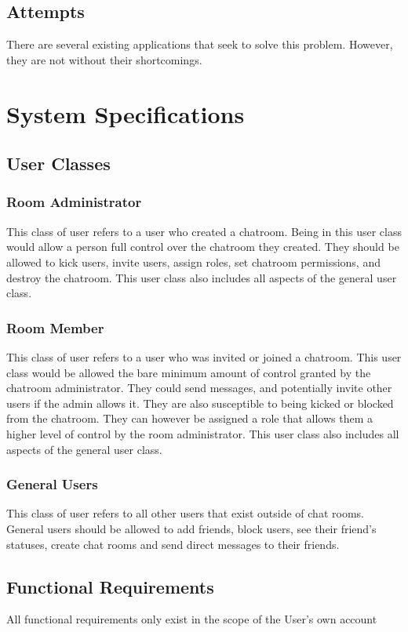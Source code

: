 \documentclass[11pt]{article}
\theoremstyle{plain}
\theoremstyle{definition}
\begin{document}
\subsection{Attempts}\label{sec:attempts}
There are several existing applications that seek to solve this problem. However, they are not without their shortcomings.

\section{System Specifications}\label{sec:sysspecs}
\subsection{User Classes}\label{sec:userclasses}

\subsubsection{Room Administrator}
This class of user refers to a user who created a chatroom. Being in this user class would allow a person full control over the chatroom they created. They should be allowed to kick users, invite users, assign roles, set chatroom permissions, and destroy the chatroom. This user class also includes all aspects of the general user class. 
\subsubsection{Room Member}
This class of user refers to a user who was invited or joined a chatroom. This user class would be allowed the bare minimum amount of control granted by the chatroom administrator. They could send messages, and potentially invite other users if the admin allows it. They are also susceptible to being kicked or blocked from the chatroom. They can however be assigned a role that allows them a higher level of control by the room administrator.  This user class also includes all aspects of the general user class. 
\subsubsection{General Users}
This class of user refers to all other users that exist outside of chat rooms. General users should be allowed to add friends, block users, see their friend's statuses, create chat rooms and send direct messages to their friends.

\subsection{Functional Requirements}\label{sec:funcrequirements}
All functional requirements only exist in the scope of the User's own account
\end{document}
